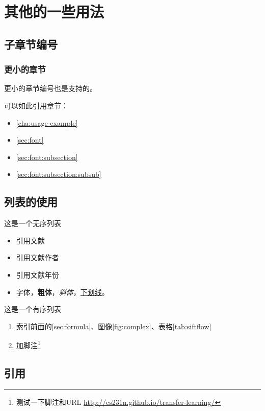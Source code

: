 \section{其他的一些用法}
\label{sec:font}
\subsection{子章节编号}
\label{sec:font:subsection}
\subsubsection{更小的章节}
\label{sec:font:subsection:subsub}
更小的章节编号也是支持的。

可以如此引用章节：

\begin{itemize}
    \item \autoref{cha:usage-example}
    \item  \autoref{sec:font}
    \item  \autoref{sec:font:subsection}
    \item  \autoref{sec:font:subsection:subsub}
\end{itemize}


\subsection{列表的使用}
\label{sec:font:list}

这是一个无序列表
\begin{itemize}
    \item 引用文献\cite{long2015fully}
    \item 引用文献作者\citeauthor{long2015fully}
    \item 引用文献年份\citeyear{long2015fully} 
    \item 字体{\color{red}{变红}}，\textbf{粗体}，\textit{斜体}，\underline{下划线}。
\end{itemize}

这是一个有序列表
\begin{enumerate}
    \item 索引前面的\autoref{sec:formula}、图像\ref{fig:complex}、表格\ref{tab:siftflow}
    \item 加脚注\footnote{测{试一下}脚注和URL \url{http://cs231n.github.io/transfer-learning/}}
\end{enumerate}

\subsection{引用}

